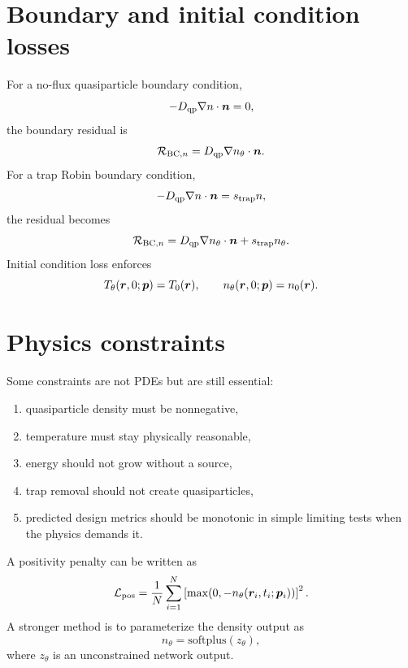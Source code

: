 \documentclass[11pt]{article}
\begin{document}
\section{Boundary and initial condition losses}
For a no-flux quasiparticle boundary condition,
\begin{equation}
-D_{\mathrm{qp}}\nabla n\cdot\bm{n}=0,
\end{equation}
the boundary residual is
\begin{equation}
\mathcal{R}_{\mathrm{BC},n}=D_{\mathrm{qp}}\nabla n_\theta\cdot\bm{n}.
\end{equation}
For a trap Robin boundary condition,
\begin{equation}
-D_{\mathrm{qp}}\nabla n\cdot\bm{n}=s_{\mathrm{trap}}n,
\end{equation}
the residual becomes
\begin{equation}
\mathcal{R}_{\mathrm{BC},n}=D_{\mathrm{qp}}\nabla n_\theta\cdot\bm{n}+s_{\mathrm{trap}}n_\theta.
\end{equation}
Initial condition loss enforces
\begin{equation}
T_\theta(\bm{r},0;\bm{p})=T_0(\bm{r}),\qquad
n_\theta(\bm{r},0;\bm{p})=n_0(\bm{r}).
\end{equation}

\section{Physics constraints}
Some constraints are not PDEs but are still essential:
\begin{enumerate}[leftmargin=1.6em]
    \item quasiparticle density must be nonnegative,
    \item temperature must stay physically reasonable,
    \item energy should not grow without a source,
    \item trap removal should not create quasiparticles,
    \item predicted design metrics should be monotonic in simple limiting tests when the physics demands it.
\end{enumerate}
A positivity penalty can be written as
\begin{equation}
\mathcal{L}_{\mathrm{pos}}=\frac{1}{N}\sum_{i=1}^{N}\left[\max(0,-n_\theta(\bm{r}_i,t_i;\bm{p}_i))\right]^2.
\end{equation}
A stronger method is to parameterize the density output as
\begin{equation}
n_\theta=\mathrm{softplus}(z_\theta),
\end{equation}
where $z_\theta$ is an unconstrained network output.
\end{document}
